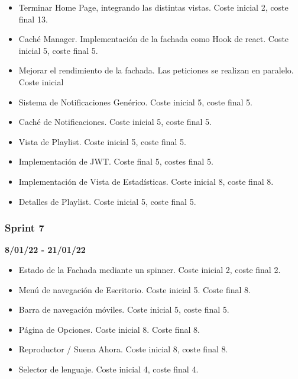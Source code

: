 \begin{itemize}
    \item Terminar Home Page, integrando las distintas vistas. Coste inicial 2, coste final 13.
    \item Caché Manager. Implementación de la fachada como Hook de react. Coste inicial 5, coste final 5.
    \item Mejorar el rendimiento de la fachada. Las peticiones se realizan en paralelo. Coste inicial 
    \item Sistema de Notificaciones Genérico. Coste inicial 5, coste final 5.
    \item Caché de Notificaciones. Coste inicial 5, coste final 5. 
    \item Vista de Playlist. Coste inicial 5, coste final 5.
    \item Implementación de JWT. Coste final 5, costes final 5.
    \item Implementación de Vista de Estadísticas. Coste inicial 8, coste final 8.
    \item Detalles de Playlist. Coste inicial 5, coste final 5.
\end{itemize}


\subsubsection{Sprint 7}
\textbf{8/01/22 - 21/01/22}

\begin{itemize}
    \item Estado de la Fachada mediante un spinner. Coste inicial 2, coste final 2.
    \item Menú de navegación de Escritorio. Coste inicial 5. Coste final 8.
    \item Barra de navegación móviles. Coste inicial 5, coste final 5.
    \item Página de Opciones. Coste inicial 8. Coste final 8.
    \item Reproductor / Suena Ahora. Coste inicial 8, coste final 8.
    \item Selector de lenguaje. Coste inicial 4, coste final 4.
\end{itemize}

